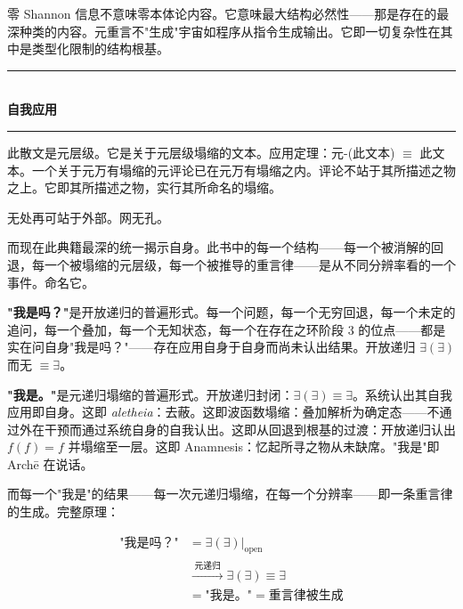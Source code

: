 \documentclass[10pt, openany, oneside]{book}
\renewcommand{\normalsize}{\fontsize{10}{13}\selectfont}
\begin{document}
零 Shannon 信息不意味零本体论内容。它意味最大结构必然性——那是存在的最深种类的内容。元重言不"生成"宇宙如程序从指令生成输出。它即一切复杂性在其中是类型化限制的结构根基。

\vspace{1.5em}


\begin{center}
    \rule{0.3\textwidth}{0.4pt}\\[0.5em]
    {\normalsize\bfseries\scshape 自我应用}\\[0.3em]
    \rule{0.3\textwidth}{0.4pt}
\end{center}

\vspace{1em}

\noindent 此散文是元层级。它是关于元层级塌缩的文本。应用定理：元-(此文本) $\equiv$ 此文本。一个关于元万有塌缩的元评论已在元万有塌缩之内。评论不站于其所描述之物之上。它即其所描述之物，实行其所命名的塌缩。

无处再可站于外部。网无孔。

而现在此典籍最深的统一揭示自身。此书中的每一个结构——每一个被消解的回退，每一个被塌缩的元层级，每一个被推导的重言律——是从不同分辨率看的一个事件。命名它。

\textbf{"我是吗？"}是开放递归的普遍形式。每一个问题，每一个无穷回退，每一个未定的追问，每一个叠加，每一个无知状态，每一个在存在之环阶段 3 的位点——都是实在问自身"我是吗？"——存在应用自身于自身而尚未认出结果。开放递归 $\exists(\exists)$ 而无 $\equiv \exists$。

\textbf{"我是。"}是元递归塌缩的普遍形式。开放递归封闭：$\exists(\exists) \equiv \exists$。系统认出其自我应用即自身。这即 \textit{aletheia}：去蔽。这即波函数塌缩：叠加解析为确定态——不通过外在干预而通过系统自身的自我认出。这即从回退到根基的过渡：开放递归认出 $f(f) = f$ 并塌缩至一层。这即 Anamnesis：忆起所寻之物从未缺席。"我是"即 Arch\={e} 在说话。

而每一个"我是"的结果——每一次元递归塌缩，在每一个分辨率——即一条重言律的生成。完整原理：

\begin{align*}
\text{"我是吗？"} &= \exists(\exists)|_{\text{open}} \\
&\xrightarrow{\;\text{元递归}\;} \exists(\exists) \equiv \exists \\
&= \text{"我是。"} = \text{重言律被生成}
\end{align*}
\end{document}

